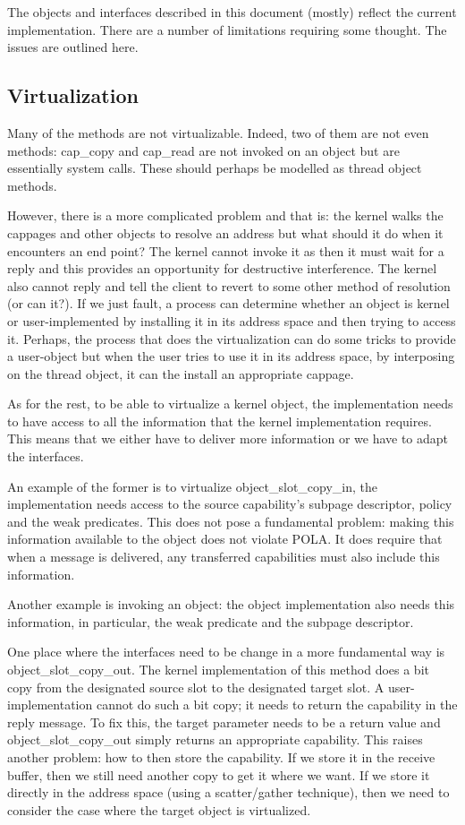 \documentclass[12pt,a4paper]{book}
\begin{document}
The objects and interfaces described in this document (mostly) reflect
the current implementation.  There are a number of limitations
requiring some thought.  The issues are outlined here.

\subsection{Virtualization}

Many of the methods are not virtualizable.  Indeed, two of them are
not even methods: cap\_copy and cap\_read are not invoked on an object
but are essentially system calls.  These should perhaps be modelled as
thread object methods.

However, there is a more complicated problem and that is: the kernel
walks the cappages and other objects to resolve an address but what
should it do when it encounters an end point?  The kernel cannot
invoke it as then it must wait for a reply and this provides an
opportunity for destructive interference.  The kernel also cannot
reply and tell the client to revert to some other method of resolution
(or can it?).  If we just fault, a process can determine whether an
object is kernel or user-implemented by installing it in its address
space and then trying to access it.  Perhaps, the process that does
the virtualization can do some tricks to provide a user-object but
when the user tries to use it in its address space, by interposing on
the thread object, it can the install an appropriate cappage.

As for the rest, to be able to virtualize a kernel object, the
implementation needs to have access to all the information that the
kernel implementation requires.  This means that we either have to
deliver more information or we have to adapt the interfaces.

An example of the former is to virtualize object\_slot\_copy\_in, the
implementation needs access to the source capability's subpage
descriptor, policy and the weak predicates.  This does not pose a
fundamental problem: making this information available to the object
does not violate POLA.  It does require that when a message is
delivered, any transferred capabilities must also include this
information.

Another example is invoking an object: the object implementation also
needs this information, in particular, the weak predicate and the
subpage descriptor. 

One place where the interfaces need to be change in a more fundamental
way is object\_slot\_copy\_out.  The kernel implementation of this
method does a bit copy from the designated source slot to the
designated target slot.  A user-implementation cannot do such a bit
copy; it needs to return the capability in the reply message.  To fix
this, the target parameter needs to be a return value and
object\_slot\_copy\_out simply returns an appropriate capability.
This raises another problem: how to then store the capability.  If we
store it in the receive buffer, then we still need another copy to get
it where we want.  If we store it directly in the address space (using
a scatter/gather technique), then we need to consider the case where
the target object is virtualized.
\end{document}
